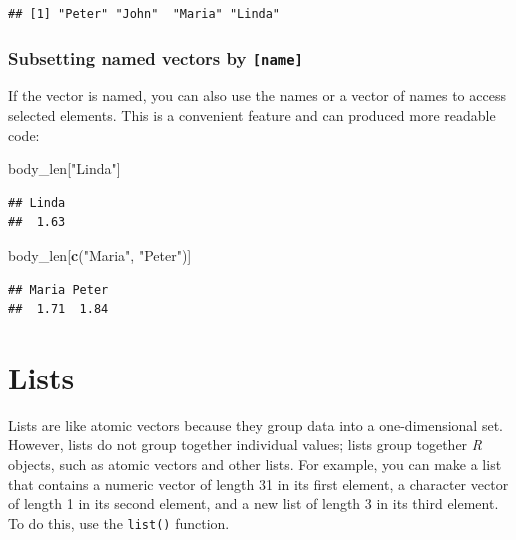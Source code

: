 \documentclass[
]{scrartcl}
\newenvironment{Shaded}{\begin{snugshade}}{\end{snugshade}}
\newcommand{\FunctionTok}[1]{\textcolor[rgb]{0.13,0.29,0.53}{\textbf{#1}}}
\newcommand{\NormalTok}[1]{#1}
\newcommand{\StringTok}[1]{\textcolor[rgb]{0.31,0.60,0.02}{#1}}
\begin{document}
\begin{verbatim}
## [1] "Peter" "John"  "Maria" "Linda"
\end{verbatim}

\hypertarget{subsetting-named-vectors-by-name}{%
\subsubsection{\texorpdfstring{Subsetting named vectors by \texttt{{[}name{]}}}{Subsetting named vectors by {[}name{]}}}\label{subsetting-named-vectors-by-name}}

If the vector is named, you can also use the names or a vector of names to access selected elements. This is a convenient feature and can produced more readable code:

\begin{Shaded}
\begin{Highlighting}[]
\NormalTok{body\_len[}\StringTok{"Linda"}\NormalTok{]}
\end{Highlighting}
\end{Shaded}

\begin{verbatim}
## Linda 
##  1.63
\end{verbatim}

\begin{Shaded}
\begin{Highlighting}[]
\NormalTok{body\_len[}\FunctionTok{c}\NormalTok{(}\StringTok{"Maria"}\NormalTok{, }\StringTok{"Peter"}\NormalTok{)]}
\end{Highlighting}
\end{Shaded}

\begin{verbatim}
## Maria Peter 
##  1.71  1.84
\end{verbatim}

\hypertarget{lists}{%
\section{Lists}\label{lists}}

Lists are like atomic vectors because they group data into a one-dimensional set. However, lists do not group together individual values; lists group together \emph{R} objects, such as atomic vectors and other lists. For example, you can make a list that contains a numeric vector of length 31 in its first element, a character vector of length 1 in its second element, and a new list of length 3 in its third element. To do this, use the \texttt{list()} function.
\end{document}
